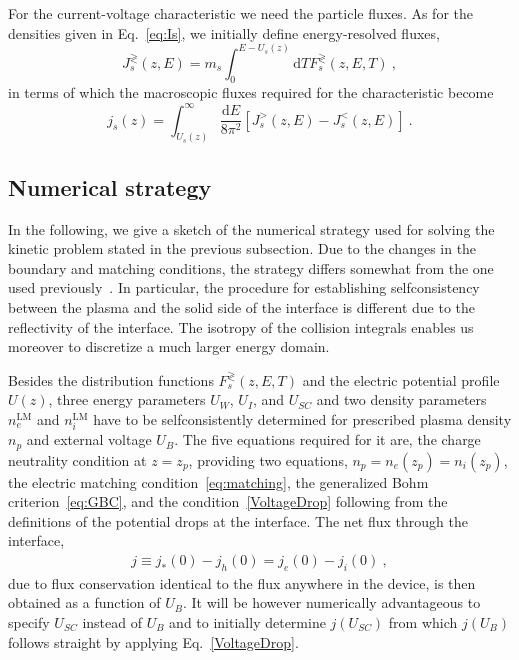 \documentclass[pre,reprint,floats]{revtex4-1}
\newcommand{\rmd}{\ensuremath{\mathrm{d}}}
\begin{document}
For the current-voltage characteristic we need the particle fluxes. As for the densities given in
Eq.~\eqref{eq:Is}, we initially define energy-resolved fluxes,
\begin{equation}
\label{eq:Js}
J_s^\gtrless(z,E) = m_s\int_{0}^{E-U_s(z)}\rmd TF_s^\gtrless(z,E,T)~,
\end{equation}
in terms of which the macroscopic fluxes required for the characteristic become
\begin{equation}
\label{eq:js}
j_s(z) = \int_{U_s(z)}^\infty\frac{ \mathrm{d} E}{8\pi^2}\left[J_s^>(z,E)- J_s^<(z,E)\right]~.
\end{equation}
	
\subsection{Numerical strategy}\label{sec:Numerics}
In the following, we give a sketch of the numerical strategy used for solving the kinetic problem 
stated in the previous subsection. Due to the changes in the boundary and matching conditions,
the strategy differs somewhat from the one used previously~\cite{RBF20}. In particular, the procedure for 
establishing selfconsistency between the plasma and the solid side of the interface is different due to 
the reflectivity of the interface. The isotropy of the collision integrals enables us moreover to discretize 
a much larger energy domain.

Besides the distribution functions $F_s^\gtrless(z,E,T)$ and the electric potential profile $U(z)$, 
three energy parameters $U_W$, $U_I$, and $U_{SC}$ and two density parameters 
$n^\textrm{LM}_e$ and $n^\textrm{LM}_i$ have to be selfconsistently determined for prescribed 
plasma density $n_p$ and external voltage $U_B$. The five equations required for it are,
the charge neutrality condition at $z=z_p$, providing two equations, $n_p=n_e(z_p)=n_i(z_p)$, the 
electric matching condition~\eqref{eq:matching}, the generalized Bohm criterion~\eqref{eq:GBC}, and 
the condition~\eqref{VoltageDrop} following from the definitions of the potential drops at the interface. 
The net flux through the interface,
\begin{align}
j\equiv j_*(0)-j_h(0)=j_e(0)-j_i(0)~, 
\end{align}
due to flux conservation identical to the flux anywhere in the device, is then obtained 
as a function of $U_B$. It will be however numerically advantageous to specify 
$U_{SC}$ instead of $U_B$ and to initially determine $j(U_{SC})$ from which 
$j(U_B)$ follows straight by applying Eq.~\eqref{VoltageDrop}.
	
\end{document}
